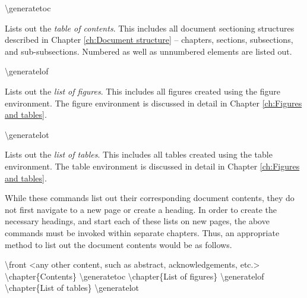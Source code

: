 \documentclass[twoside,openany]{thesis}
\begin{document}
\begin{listing}

\item   {\ttfamily\textbackslash generatetoc}

        Lists out the {\itshape table of contents}.
        This includes all document sectioning structures described in Chapter \ref{ch:Document structure} -- chapters, sections, subsections, and sub-subsections.
        Numbered as well as unnumbered elements are listed out.

\item   {\ttfamily\textbackslash generatelof}

        Lists out the {\itshape list of figures}.
        This includes all figures created using the {\ttfamily figure} environment.
        The {\ttfamily figure} environment is discussed in detail in Chapter \ref{ch:Figures and tables}.

\item   {\ttfamily\textbackslash generatelot}

        Lists out the {\itshape list of tables}.
        This includes all tables created using the {\ttfamily table} environment.
        The {\ttfamily table} environment is discussed in detail in Chapter \ref{ch:Figures and tables}.

\end{listing}

While these commands list out their corresponding document contents, they do not first navigate to a new page or create a heading.
In order to create the necessary headings, and start each of these lists on new pages, the above commands must be invoked within separate chapters.
Thus, an appropriate method to list out the document contents would be as follows.

{\ttfamily
    \textbackslash front\linebreak
    <any other content, such as abstract, acknowledgements, etc.>\linebreak
    \textbackslash chapter\{Contents\}\linebreak
        \null\quad\textbackslash generatetoc\linebreak
    \textbackslash chapter\{List of figures\}\linebreak
        \null\quad\textbackslash generatelof\linebreak
    \textbackslash chapter\{List of tables\}\linebreak
        \null\quad\textbackslash generatelot\linebreak
}
\end{document}
